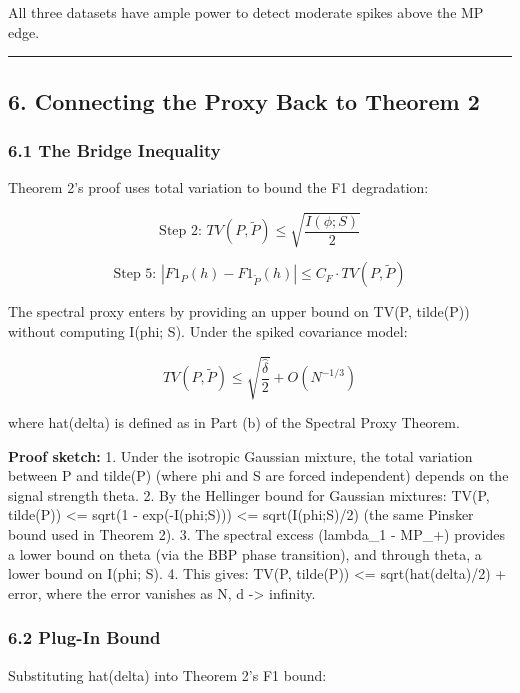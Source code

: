 \documentclass[
  12pt,
]{article}
\begin{document}
All three datasets have ample power to detect moderate spikes above the
MP edge.

\begin{center}\rule{0.5\linewidth}{0.5pt}\end{center}

\subsection{6. Connecting the Proxy Back to Theorem
2}\label{connecting-the-proxy-back-to-theorem-2}

\subsubsection{6.1 The Bridge Inequality}\label{the-bridge-inequality}

Theorem 2's proof uses total variation to bound the F1 degradation:

\[\text{Step 2: } TV(P, \tilde{P}) \leq \sqrt{\frac{I(\phi; S)}{2}}\]

\[\text{Step 5: } |F1_P(h) - F1_{\tilde{P}}(h)| \leq C_F \cdot TV(P, \tilde{P})\]

The spectral proxy enters by providing an upper bound on TV(P, tilde(P))
without computing I(phi; S). Under the spiked covariance model:

\[TV(P, \tilde{P}) \leq \sqrt{\frac{\hat{\delta}}{2}} + O(N^{-1/3})\]

where hat(delta) is defined as in Part (b) of the Spectral Proxy
Theorem.

\textbf{Proof sketch:} 1. Under the isotropic Gaussian mixture, the
total variation between P and tilde(P) (where phi and S are forced
independent) depends on the signal strength theta. 2. By the Hellinger
bound for Gaussian mixtures: TV(P, tilde(P)) \textless= sqrt(1 -
exp(-I(phi;S))) \textless= sqrt(I(phi;S)/2) (the same Pinsker bound used
in Theorem 2). 3. The spectral excess (lambda\_1 - MP\_+) provides a
lower bound on theta (via the BBP phase transition), and through theta,
a lower bound on I(phi; S). 4. This gives: TV(P, tilde(P)) \textless=
sqrt(hat(delta)/2) + error, where the error vanishes as N, d
-\textgreater{} infinity.

\subsubsection{6.2 Plug-In Bound}\label{plug-in-bound}

Substituting hat(delta) into Theorem 2's F1 bound:
\end{document}
